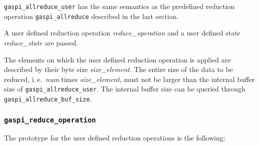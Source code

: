 \documentclass[a4paper]{article}
\newcommand{\secref}[1]{section\xspace\ref{#1}}
\newlength{\st}\setlength{\st}{0pt}
\newcommand{\zsep}[1]{#1}
\newcommand{\gaspiprefix}{gaspi}
\newcommand{\function}[1]{{\tt #1}}
\newcommand{\parameter}[1]{{\it #1}}
\newcommand{\gaspifunction}[1]{\function{\protect\zsep{\gaspiprefix\_#1}}}
\newcommand{\GASPISUCC}{{\tt\protect\zsep{GASPI\_SUCCESS}}}
\newcommand{\GASPITIME}{{\tt\protect\zsep{GASPI\_TIMEOUT}}}
\newcommand{\GASPIGERR}{{\tt\protect\zsep{GASPI\_ERROR}}}
\begin{document}
\gaspifunction{allreduce\_user} has the same semantics as the predefined reduction operation
\gaspifunction{allreduce} described in the last section.

A user defined reduction operation \parameter{reduce\_operation} and a user
defined state \parameter{reduce\_state} are passed.

The elements on which the user defined reduction operation is applied
are described by their byte size \parameter{size\_element}. The entire
size of the data to be reduced, i.\,e.\ \parameter{num} times \parameter{size\_element},
must not be larger than the internal buffer size of \gaspifunction{allreduce\_user}.
The internal buffer size can be queried through \gaspifunction{allreduce\_buf\_size}.


%

\subsubsection{\gaspifunction{reduce\_operation}}

The prototype for the user defined reduction operations is the following:
\end{document}
